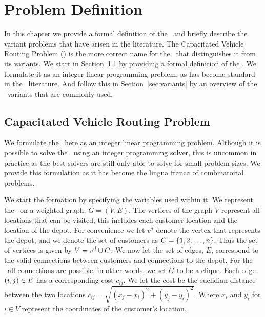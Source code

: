 
\chapter{Problem Definition}
\label{chap:pd}

In this chapter we provide a formal definition of the \VRP\ and briefly describe the variant problems that have arisen in the literature. The Capacitated Vehicle Routing Problem (\CVRP) is the more correct name for the \VRP\ that distinguishes it from its variants. We start in Section~\ref{sec:capacitatedvehicleroutingproblem} by providing a formal definition of the \CVRP. We formulate it as an integer linear programming problem, as has become standard in the \VRP\ literature. And follow this in Section~\ref{sec:variants} by an overview of the \VRP\ variants that are commonly used.

\section{Capacitated Vehicle Routing Problem}
\label{sec:capacitatedvehicleroutingproblem}

We formulate the \CVRP\ here as an integer linear programming problem. Although it is possible to solve the \CVRP\ using an integer programming solver, this is uncommon in practice as the best solvers are still only able to solve for small problem sizes. We provide this formulation as it has become the lingua franca of combinatorial problems.

We start the formation by specifying the variables used within it. We represent the \CVRP\ on a weighted graph, $G = (V, E)$. The vertices of the graph $V$ represent all locations that can be visited, this includes each customer location and the location of the depot. For convenience we let $v^d$ denote the vertex that represents the depot, and we denote the set of customers as $C = \{1,2,\ldots,n\}$. Thus the set of vertices is given by $V = v^d \cup C$. We now let the set of edges, $E$, correspond to the valid connections between customers and connections to the depot. For the \CVRP\ all connections are possible, in other words, we set $G$ to be a clique. Each edge $(i,j) \in E$ has a corresponding cost $c_{ij}$. We let the cost be the euclidian distance between the two locations $c_{ij} = \sqrt{(x_j - x_i)^2 + (y_j -  y_i)^2}$. Where $x_i$ and $y_i$ for $i \in V$ represent the coordinates of the customer's location. 

